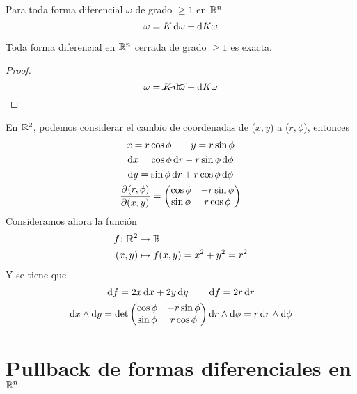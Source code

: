 \begin{lema}
    Para toda forma diferencial $\omega$ de grado $\geq 1$ en $\mathbb{R}^n$
    \[
        \omega = K \dif \omega + \dif K \omega
    \]
\end{lema}

\begin{teo}
    Toda forma diferencial en $\mathbb{R}^n$ cerrada de grado $\geq 1$ es exacta.
\end{teo}
\begin{proof}
    \[
        \omega = \cancel{K\dif \omega} + \dif K \omega
    \]
\end{proof}

\begin{example*}
    En $\mathbb{R}^2$, podemos considerar el cambio de coordenadas de ($x, y$) a ($r, \phi$), entonces
    \begin{gather*}
        x = r \cos \phi \qquad y = r \sin \phi \\
        \dif x = \cos \phi \dif r - r \sin \phi \dif \phi \\
        \dif y = \sin \phi \dif r + r \cos \phi \dif \phi \\
        \pdv{(r, \phi)}{(x,y)} =
        \begin{pmatrix}
            \cos \phi & - r \sin \phi \\ \sin \phi & r \cos \phi
        \end{pmatrix}
    \end{gather*}
    Consideramos ahora la función
    \[
        \begin{aligned}
            f \colon \mathbb{R}^2 &\to \mathbb{R} \\
            (x,y) &\mapsto f(x,y) = x^2 + y^2 = r^2
        \end{aligned}
    \]
    Y se tiene que
    \begin{gather*}
        \dif f = 2x \dif x + 2y \dif y \qquad \dif f = 2 r \dif r \\
        \dif x \wedge \dif y = \det
        \begin{pmatrix}
            \cos \phi & - r \sin \phi \\
            \sin \phi &   r \cos \phi
        \end{pmatrix} \dif r \wedge \dif \phi = r \dif r \wedge \dif \phi
    \end{gather*}
\end{example*}

\section{Pullback de formas diferenciales en $\mathbb{R}^n$}

